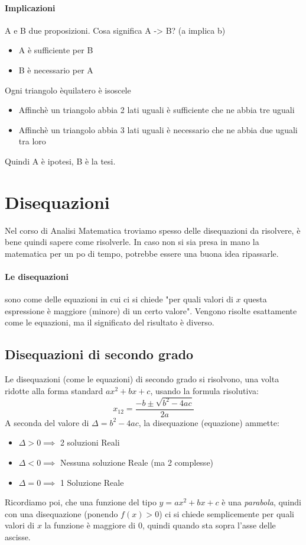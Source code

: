 \documentclass[12pt, a4paper, openany]{book}
\begin{document}
\paragraph*{Implicazioni}
A e B due proposizioni. Cosa significa A -> B? (a implica b)
\begin{itemize}
	\item A è sufficiente per B
	\item B è necessario per A
\end{itemize}
Ogni triangolo èquilatero è isoscele
\begin{itemize}
	\item Affinchè un triangolo abbia 2 lati uguali è sufficiente che ne abbia tre uguali
	\item Affinchè un triangolo abbia 3 lati uguali è necessario che ne abbia due uguali tra loro
\end{itemize}
Quindi A è ipotesi, B è la tesi.
\section{Disequazioni}
Nel corso di Analisi Matematica troviamo spesso delle disequazioni da risolvere, è bene quindi sapere come risolverle.
In caso non si sia presa in mano la matematica per un po di tempo, potrebbe essere una buona idea ripassarle.

\paragraph*{Le disequazioni} sono come delle equazioni in cui ci si chiede "per quali valori di $x$ questa espressione è maggiore (minore) di un certo valore".
Vengono risolte esattamente come le equazioni, ma il significato del risultato è diverso.

\subsection{Disequazioni di secondo grado}
Le disequazioni (come le equazioni) di secondo grado si risolvono, una volta ridotte alla forma standard $ax^2+bx+c$, usando la formula risolutiva:
$$x_{1 2} = \frac{-b\pm\sqrt{b^2-4ac}}{2a}$$
A seconda del valore di $\Delta = b^2-4ac$, la disequazione (equazione) ammette:
\begin{itemize}
	\item $\Delta > 0 \implies $ 2 soluzioni Reali
 	\item $\Delta < 0 \implies $ Nessuna soluzione Reale (ma 2 complesse)
	\item $\Delta = 0 \implies $ 1 Soluzione Reale  
\end{itemize}
Ricordiamo poi, che una funzione del tipo $y=ax^2 +bx +c$ è una \emph{parabola}, quindi con una disequazione (ponendo $f(x)>0$) ci si chiede semplicemente per quali valori di $x$ la funzione è maggiore di 0,
quindi quando sta sopra l'asse delle ascisse.
\end{document}
